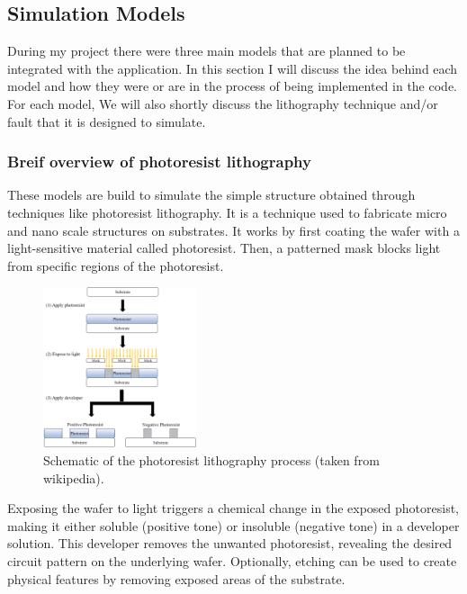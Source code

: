 \subsection{Simulation Models}

During my project there were three main models that are planned to be integrated with the application. 
In this section I will discuss the idea behind each model and how they were or are in the process of being implemented in the code.
For each model, We will also shortly discuss the lithography technique and/or fault that it is designed to simulate.

\subsubsection{Breif overview of photoresist lithography}

These models are build to simulate the simple structure obtained through techniques like photoresist 
lithography. It is a technique used to fabricate micro and nano scale structures on substrates. 
It works by first coating the wafer with a light-sensitive material called photoresist. Then, a patterned
 mask blocks light from specific regions of the photoresist. 
 \begin{figure}[h]
    \centering
    \includegraphics[width=0.4\textwidth]{images/photo_resist.png}
    \caption{Schematic of the photoresist lithography process (taken from wikipedia).}
    \label{fig:lithography}
 \end{figure}

 \FloatBarrier

 Exposing the wafer to light triggers a 
 chemical change in the exposed photoresist, making it either soluble (positive tone) or insoluble 
 (negative tone) in a developer solution. This developer removes the unwanted photoresist, 
 revealing the desired circuit pattern on the underlying wafer. Optionally, etching can be used to 
 create physical features by removing exposed areas of the substrate.

